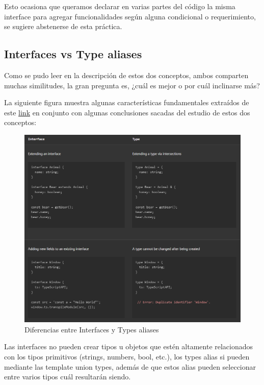 Esto ocasiona que queramos declarar en varias partes del código la misma interface para agregar funcionalidades según alguna condicional o requerimiento, se sugiere abstenerse de esta práctica.


\subsection{Interfaces vs Type aliases}

Como se pudo leer en la descripción de estos dos conceptos, ambos comparten muchas similitudes, la gran pregunta es, ¿cuál es mejor o por cuál inclinarse más?

La siguiente figura muestra algunas características fundamentales extraídos de este \textcolor{enlaces}{\href{https://www.typescriptlang.org/docs/handbook/2/everyday-types.html\#differences-between-type-aliases-and-interfaces}{link}} en conjunto con algunas conclusiones sacadas del estudio de estos dos conceptos:
\begin{figure}[H]
    \centering
    \caption{Diferencias entre Interfaces y Types aliases}
    \label{fig:4}
    \includegraphics[width=\textwidth]{ss/4.png}
\end{figure}

Las interfaces no pueden crear tipos u objetos que estén altamente relacionados con los tipos primitivos (strings, numbers, bool, etc.), los types alias si pueden mediante las template union types, además de que estos alias pueden seleccionar entre varios tipos cuál resultarán siendo.

